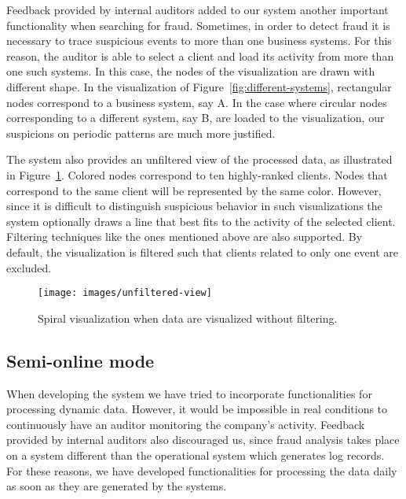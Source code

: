 \documentclass[conference]{IEEEtran}
\begin{document}
Feedback provided by internal auditors added to our system another
important functionality when searching for fraud. Sometimes, in
order to detect fraud it is necessary to trace suspicious events to
more than one business systems. For this reason, the auditor is able
to select a client and load its activity from more than one such
systems. In this case, the nodes of the visualization are drawn with
different shape. In the visualization of
Figure~\ref{fig:different-systems}, rectangular nodes correspond to
a business system, say A. In the case where circular nodes
corresponding to a different system, say B, are loaded to the
visualization, our suspicions on periodic patterns are much more
justified.

The system also provides an unfiltered view of the processed data,
as illustrated in Figure~\ref{fig:unfiltered-view}. Colored nodes
correspond to ten highly-ranked clients. Nodes that correspond to
the same client will be represented by the same color. However,
since it is difficult to distinguish suspicious behavior in such
visualizations the system optionally draws a line that best fits to
the activity of the selected client. Filtering techniques like the
ones mentioned above are also supported. By default, the
visualization is filtered such that clients related to only one
event are excluded.

\begin{figure}[h!tb]
  \centering
  \texttt{[image: images/unfiltered-view]}
  \caption{Spiral visualization when data are visualized without filtering.}
  \label{fig:unfiltered-view}
\end{figure}

\subsection{Semi-online mode}

When developing the system we have tried to incorporate
functionalities for processing dynamic data. However, it would be
impossible in real conditions to continuously have an auditor
monitoring the company's activity. Feedback provided by internal
auditors also discouraged us, since fraud analysis takes place on a
system different than the operational system which generates log
records. For these reasons, we have developed functionalities for
processing the data daily as soon as they are generated by the
systems.
\end{document}
